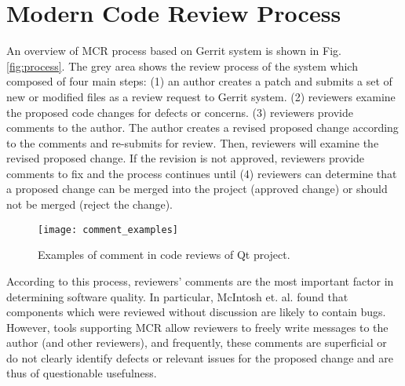 

\section{Modern Code Review Process}

An overview of MCR process based on Gerrit system is shown in Fig. \ref{fig:process}.
The grey area shows the review process of the system which composed of four main steps:
(1) an author creates a patch and submits a set of new or modified files as a review request to Gerrit system.
(2) reviewers examine the proposed code changes for defects or concerns.
(3) reviewers provide comments to the author. The author creates a revised proposed change according to the comments and re-submits for review. Then, reviewers will examine the revised proposed change. If the revision is not approved, reviewers provide comments to fix and the process continues until (4) reviewers can determine that a proposed change can be merged into the project (approved change) or should not be merged (reject the change). 

\begin{figure}[!t]
\centering
\texttt{[image: comment\_examples]}
\caption{Examples of comment in code reviews of Qt project.}
\label{fig:example}
\end{figure}

According to this process, reviewers' comments are the most important factor in determining software quality.
In particular, McIntosh et. al. \cite{Mcintosh} found that components which were reviewed without discussion are likely to contain bugs.
However, tools supporting MCR allow reviewers to freely write messages to the author (and other reviewers), and frequently, these comments are superficial or do not clearly identify defects or relevant issues for the proposed change and are thus of questionable usefulness.

